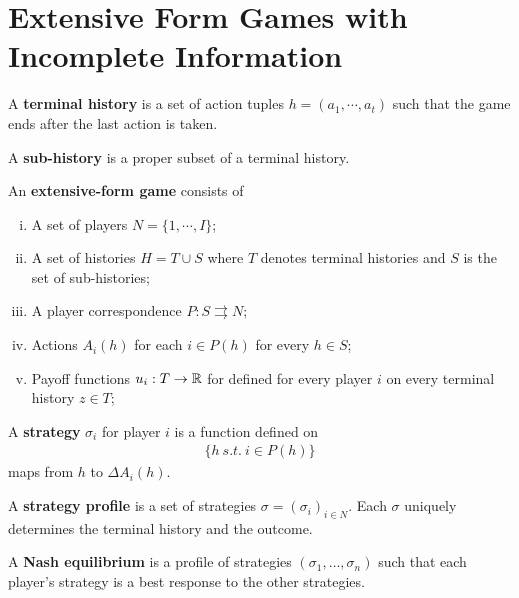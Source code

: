 \documentclass{article}
\begin{document}
   	\section{Extensive Form Games with Incomplete Information}
   	\begin{definition}
   		A \textbf{terminal history} is a set of action tuples $h=(a_1, \cdots, a_t)$ such that the game ends after the last action is taken.
   	\end{definition}
   	
   	\begin{definition}
   		A \textbf{sub-history} is a proper subset of a terminal history.
   	\end{definition}
   	
   	\begin{definition}
   		An \textbf{extensive-form game} consists of
   		\begin{enumerate}[(i)]
   			\item A set of players $N = \{1, \cdots, I\}$;
   			\item A set of histories $H = T \cup S$ where $T$ denotes terminal histories and $S$ is the set of sub-histories;
   			\item A player correspondence $P: S \rightrightarrows N$;
   			\item Actions $A_i(h)$ for each $i \in P(h)$ for every $h \in S$;
   			\item Payoff functions $u_i:T \to \mathbb{R}$ for defined for every player $i$ on every terminal history $z \in T$;
   		\end{enumerate}
   	\end{definition}
   	
   	\begin{definition}
   		A \textbf{strategy} $\sigma_i$ for player $i$ is a function defined on 
   		\begin{align}
   			\{h\ s.t.\ i \in P(h)\}
   		\end{align}
   		maps from $h$ to $\Delta A_i(h)$.
   	\end{definition}
   	
   	\begin{definition}
   		A \textbf{strategy profile} is a set of strategies $\sigma = (\sigma_i)_{i \in N}$. Each $\sigma$ uniquely determines the terminal history and the outcome.
   	\end{definition}
   	
   	\begin{definition}
   		A \textbf{Nash equilibrium} is a profile of strategies $\left(\sigma_{1}, \ldots, \sigma_{n}\right)$ such that each player's strategy is a best response to the other strategies.
   	\end{definition}
   	
\end{document}
